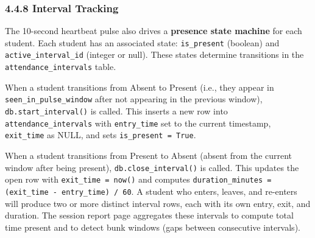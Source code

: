 \documentclass{report}
\begin{document}
\subsubsection*{4.4.8 Interval Tracking}
\normalsize{
The 10-second heartbeat pulse also drives a \textbf{presence state machine} for each student. Each student\vspace{3pt} has an associated state: \texttt{is\_present} (boolean) and \texttt{active\_interval\_id} (integer or null). These\vspace{3pt} states determine transitions in the \texttt{attendance\_intervals} table.

When a student transitions from Absent to Present (i.e., they appear in \texttt{seen\_in\_pulse\_window}\vspace{3pt} after not appearing in the previous window), \texttt{db.start\_interval()} is called. This inserts a new\vspace{3pt} row into \texttt{attendance\_intervals} with \texttt{entry\_time} set to the current timestamp, \texttt{exit\_time}\vspace{3pt} as NULL, and sets \texttt{is\_present = True}.

When a student transitions from Present to Absent (absent from the current window after being\vspace{3pt} present), \texttt{db.close\_interval()} is called. This updates the open row with \texttt{exit\_time = now()} and\vspace{3pt} computes \texttt{duration\_minutes = (exit\_time - entry\_time) / 60}. A student who enters, leaves, and\vspace{3pt} re-enters will produce two or more distinct interval rows, each with its own entry, exit, and duration.\vspace{3pt} The session report page aggregates these intervals to compute total time present and to detect\vspace{3pt} bunk windows (gaps between consecutive intervals).
}
\end{document}
